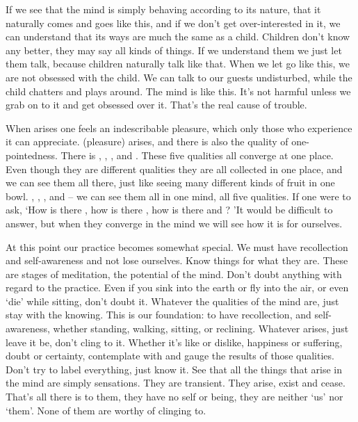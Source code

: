 If we see that the mind is simply behaving according to its nature, that it naturally comes and goes like this, and if we don't get over-interested in it, we can understand that its ways are much the same as a child. Children don't know any better, they may say all kinds of things. If we understand them we just let them talk, because children naturally talk like that. When we let go like this, we are not obsessed with the child. We can talk to our guests undisturbed, while the child chatters and plays around. The mind is like this. It's not harmful unless we grab on to it and get obsessed over it. That's the real cause of trouble. 

When  arises one feels an indescribable pleasure, which only those who experience it can appreciate.  (pleasure) arises, and there is also the quality of one-pointedness. There is , , ,  and . These five qualities all converge at one place. Even though they are different qualities they are all collected in one place, and we can see them all there, just like seeing many different kinds of fruit in one bowl. , , ,  and  -- we can see them all in one mind, all five qualities. If one were to ask, `How is there , how is there , how is there  and ? 'It would be difficult to answer, but when they converge in the mind we will see how it is for ourselves. 

At this point our practice becomes somewhat special. We must have recollection and self-awareness and not lose ourselves. Know things for what they are. These are stages of meditation, the potential of the mind. Don't doubt anything with regard to the practice. Even if you sink into the earth or fly into the air, or even `die' while sitting, don't doubt it. Whatever the qualities of the mind are, just stay with the knowing. This is our foundation: to have  recollection, and  self-awareness, whether standing, walking, sitting, or reclining. Whatever arises, just leave it be, don't cling to it. Whether it's like or dislike, happiness or suffering, doubt or certainty, contemplate with  and gauge the results of those qualities. Don't try to label everything, just know it. See that all the things that arise in the mind are simply sensations. They are transient. They arise, exist and cease. That's all there is to them, they have no self or being, they are neither `us' nor `them'. None of them are worthy of clinging to.

